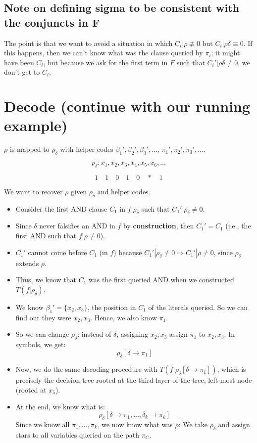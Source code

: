 \subsection*{Note on defining sigma to be consistent with the conjuncts in F}
\noindent
The point is that we want to avoid a situation in which \( C_i | \rho \not\equiv 0 \) but \( C_i | \rho\delta \equiv 0 \). If this happens, then we can't know what was the clause queried by \( \pi_i \); it might have been \( C_i \), but because we ask for the first term in \( F \) such that \( C_i' | \rho\delta \neq 0 \), we don't get to \( C_i \).


\section*{Decode (continue with our running example)}
\noindent
\( \rho \) is mapped to \( \rho_{\delta} \) with helper codes \( \beta_1', \beta_2', \beta_3', \dots \), \( \pi_1', \pi_2', \pi_3', \dots \).

\[
\rho_{\delta} : x_1, x_2, x_3, x_4, x_5, x_6, \dots
\]

\[
1 \quad 1 \quad 0 \quad 1 \quad 0 \quad * \quad 1
\]

\noindent
We want to recover \( \rho \) given \( \rho_{\delta} \) and helper codes.

\begin{itemize}
    \item Consider the first AND clause \( C_1 \) in \( f | \rho_{\delta} \) such that \( C_1' | \rho_{\delta} \neq 0 \).
    \item Since \( \delta \) never falsifies an AND in \( f \) by \textbf{construction}, then \( C_1' = C_1 \) (i.e., the first AND such that \( f | \rho \neq 0 \)).
    \item \( C_1' \) cannot come before \( C_1 \) (in \( f \)) because \( C_1' | \rho_{\delta} \neq 0 \Rightarrow C_1' | \rho \neq 0 \), since \( \rho_{\delta} \) extends \( \rho \).
    \item Thus, we know that \( C_1 \) was the first queried AND when we constructed \( T(f | \rho_{\delta}) \).
    \item We know \( \beta_1' = \{ x_2, x_3 \} \), the position in \( C_1 \) of the literals queried. So we can find out they were \( x_2, x_3 \). Hence, we also know \( \pi_1 \).
    \item So we can change \( \rho_{\delta} \): instead of \( \delta \), assigning \( x_2, x_3 \) assign \( \pi_1 \) to \( x_2, x_3 \). In symbols, we get:
    \[
    \rho_{\delta} [\delta \to \pi_1]
    \]
    \item Now, we do the same decoding procedure with \( T(f | \rho_{\delta} [\delta \to \pi_1]) \), which is precisely the decision tree rooted at the third layer of the tree, left-most node (rooted at $x_5$).
    \item At the end, we know what is:
    \[
    \rho_{\delta} [\delta \to \pi_1, \dots, \delta_k \to \pi_k]
    \]
    Since we know all \( \pi_1, \dots, \pi_k \), we now know what was \( \rho \): We take \( \rho_{\delta} \) and assign stars to all variables queried on the path \( \pi_C \).
\end{itemize}
\bigskip 

